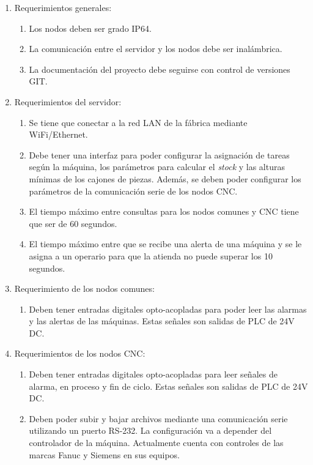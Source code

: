 \documentclass[11pt]{charter}
\begin{document}
\begin{enumerate}
    \item Requerimientos generales:
    \begin{enumerate}
        \item Los nodos deben ser grado IP64.
        \item La comunicación entre el servidor y los nodos debe ser inalámbrica.
        \item La documentación del proyecto debe seguirse con control de versiones GIT. 
    \end{enumerate}
    \item Requerimientos del servidor:
    \begin{enumerate}
        \item Se tiene que conectar a la red LAN de la fábrica mediante WiFi/Ethernet.
        \item Debe tener una interfaz para poder configurar la asignación de tareas según la máquina, los parámetros para calcular el \textit{stock} y las alturas mínimas de los cajones de piezas. Además, se deben poder configurar los parámetros de la comunicación serie de los nodos CNC.
        \item El tiempo máximo entre consultas para los nodos comunes y CNC tiene que ser de 60 segundos.
        \item El tiempo máximo entre que se recibe una alerta de una máquina y se le asigna a un operario para que la atienda no puede superar los 10 segundos. 
    \end{enumerate}
    \item Requerimiento de los nodos comunes:
    \begin{enumerate}
        \item Deben tener entradas digitales opto-acopladas para poder leer las alarmas y las alertas de las máquinas. Estas señales son salidas de PLC de 24V DC.
    \end{enumerate}
    \item Requerimientos de los nodos CNC:
    \begin{enumerate}
        \item Deben tener entradas digitales opto-acopladas para leer señales de alarma, en proceso y fin de ciclo. Estas señales son salidas de PLC de 24V DC.
        \item Deben poder subir y bajar archivos mediante una comunicación serie utilizando un puerto RS-232. La configuración va a depender del controlador de la máquina. Actualmente \empclientename cuenta con controles de las marcas Fanuc y Siemens en sus equipos.

\end{enumerate}
\end{enumerate}
\end{document}
